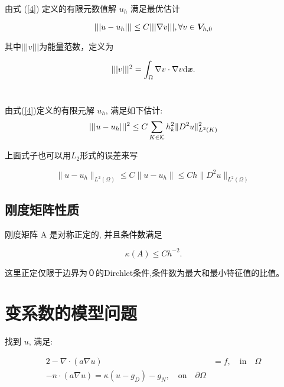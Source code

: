 \documentclass{article}
\begin{document}
\begin{theorem}[最优估计]
    由式 (\ref{4}) 定义的有限元数值解 $u_h$ 满足最优估计

    \begin{equation}
        |||u - u_h||| \le C |||\nabla v|||, \forall v \in {\boldsymbol V}_{h, 0}
    \end{equation}

    其中$|||v|||$为能量范数，定义为

    \begin{equation}
        |||v|||^2  = \int_{\Omega} \nabla v \cdot \nabla v {\mathrm d} {\boldsymbol x}.
    \end{equation}
　　　
\end{theorem}

\begin{theorem}
    由式(\ref{4})定义的有限元解 $u_h$, 满足如下估计:
    $$
    |||u-u_h|||^2\le C\sum_{K\in{\mathcal K}}h_k^2\|D^2u\|^2_{L^2(K)}
    $$
\end{theorem}

上面式子也可以用$L_2$形式的误差来写

\begin{equation}
\|u-u_h\|_{L^2(\Omega)}\le C\|u-u_h\|\le Ch\|D^2u\|_{L^2(\Omega)}
\end{equation}

\subsection{刚度矩阵性质}

\begin{theorem}
    刚度矩阵 A 是对称正定的, 并且条件数满足

    \begin{equation}
        \kappa(A) \le Ch^{-2}.
    \end{equation}
\end{theorem}

这里正定仅限于边界为０的Dirchlet条件,条件数为最大和最小特征值的比值。
\section{变系数的模型问题}
找到 $u$, 满足:

\begin{alignat}{2}
    -\nabla\cdot(a\nabla u) & =f,\quad\text{in}\quad\Omega \\
    -n\cdot(a\nabla u)=\kappa(u-g_D)-g_N, \quad\text{on}\quad\partial\Omega
\end{alignat}
\end{document}
